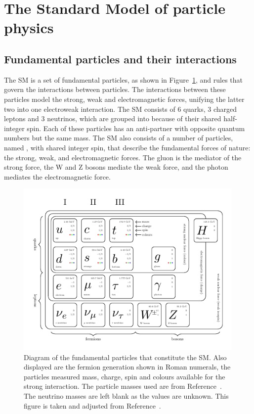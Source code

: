 \section{The Standard Model of particle physics}

\subsection{Fundamental particles and their interactions}

The \ac{SM} is a set of fundamental particles, as shown in Figure~\ref{fig:sm_diagram}, and rules that govern the interactions between particles.
The interactions between these particles model the strong, weak and electromagnetic forces, unifying the latter two into one electroweak interaction.
The \ac{SM} consists of 6 quarks, 3 charged leptons and 3 neutrinos, which are grouped into  because of their shared half-integer spin. 
Each of these particles has an anti-partner with opposite quantum numbers but the same mass.
The \ac{SM} also consists of a number of particles, named , with shared integer spin, that describe the fundamental forces of nature: the strong, weak, and electromagnetic forces. 
The gluon is the mediator of the strong force, the W and Z bosons mediate the weak force, and the photon mediates the electromagnetic force. \\

\begin{figure}[!hbtp]
\centering
    \includegraphics[width=0.99\textwidth]{Figures/SM_diagram.pdf}
\caption{Diagram of the fundamental particles that constitute the SM. Also displayed are the fermion generation shown in Roman numerals, the particles measured mass, charge, spin and colours available for the strong interaction. The particle masses used are from Reference~\cite{ParticleDataGroup:2022pth}. The neutrino masses are left blank as the values are unknown. This figure is taken and adjusted from Reference~\cite{sm_diagram}.}
\label{fig:sm_diagram}
\end{figure}

